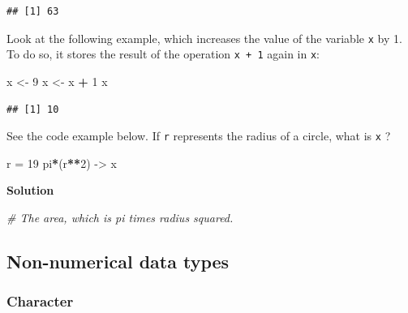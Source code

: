 \documentclass[
]{scrartcl}
\makeatletter
\newenvironment{Shaded}{\begin{snugshade}}{\end{snugshade}}
\newcommand{\CommentTok}[1]{\textcolor[rgb]{0.56,0.35,0.01}{\textit{#1}}}
\newcommand{\DecValTok}[1]{\textcolor[rgb]{0.00,0.00,0.81}{#1}}
\newcommand{\NormalTok}[1]{#1}
\newcommand{\OperatorTok}[1]{\textcolor[rgb]{0.81,0.36,0.00}{\textbf{#1}}}
\newcommand{\StringTok}[1]{\textcolor[rgb]{0.31,0.60,0.02}{#1}}
\newenvironment{kframe}{%
\medskip{}
\setlength{\fboxsep}{.8em}
 \def\at@end@of@kframe{}%
 \ifinner\ifhmode%
  \def\at@end@of@kframe{\end{minipage}}%
  \begin{minipage}{\columnwidth}%
 \fi\fi%
 \def\FrameCommand##1{\hskip\@totalleftmargin \hskip-\fboxsep
 \colorbox{shadecolor}{##1}\hskip-\fboxsep
     \hskip-\linewidth \hskip-\@totalleftmargin \hskip\columnwidth}%
 \MakeFramed {\advance\hsize-\width
   \@totalleftmargin\z@ \linewidth\hsize
   \@setminipage}}%
 {\par\unskip\endMakeFramed%
 \at@end@of@kframe}
\newenvironment{rmdblock}[1]
  {
  \begin{itemize}
  \renewcommand{\labelitemi}{
    \raisebox{-.7\height}[0pt][0pt]{
      {\setkeys{Gin}{width=3em,keepaspectratio}\texttt{[image: images/\#1]}}
    }
  }
  \setlength{\fboxsep}{1em}
  \begin{kframe}
  \item
  }
  {
  \end{kframe}
  \end{itemize}
  }
\newenvironment{myexercise}
    {\begin{rmdblock}{exercise_green}}
    {\end{rmdblock}}
\newenvironment{webexsolution}[1]
    {\par\tiny\textbf{#1}}
    {\par}
\newcommand{\webexhide}[1]{\begin{webexsolution}{#1}}
\newcommand{\webexunhide}{\end{webexsolution}}
\makeatother
\begin{document}
\begin{verbatim}
## [1] 63
\end{verbatim}

Look at the following example, which increases the value of the variable \texttt{x} by 1. To do so, it stores the result of the operation \texttt{x\ +\ 1} again in \texttt{x}:

\begin{Shaded}
\begin{Highlighting}[]
\NormalTok{x \textless{}{-}}\StringTok{ }\DecValTok{9}
\NormalTok{x \textless{}{-}}\StringTok{ }\NormalTok{x }\OperatorTok{+}\StringTok{ }\DecValTok{1}
\NormalTok{x}
\end{Highlighting}
\end{Shaded}

\begin{verbatim}
## [1] 10
\end{verbatim}

\begin{myexercise}
See the code example below. If \texttt{r} represents the radius of a
circle, what is \texttt{x} ?
\end{myexercise}

\begin{Shaded}
\begin{Highlighting}[]
\NormalTok{r =}\StringTok{ }\DecValTok{19}
\NormalTok{pi}\OperatorTok{*}\NormalTok{(r}\OperatorTok{**}\DecValTok{2}\NormalTok{) {-}\textgreater{}}\StringTok{ }\NormalTok{x}
\end{Highlighting}
\end{Shaded}

\webexhide{Solution}

\begin{Shaded}
\begin{Highlighting}[]
\CommentTok{\# The area, which is pi times radius squared.}
\end{Highlighting}
\end{Shaded}

\webexunhide

\hypertarget{non-numerical-data-types}{%
\subsection{Non-numerical data types}\label{non-numerical-data-types}}

\hypertarget{character}{%
\subsubsection{Character}\label{character}}
\end{document}
